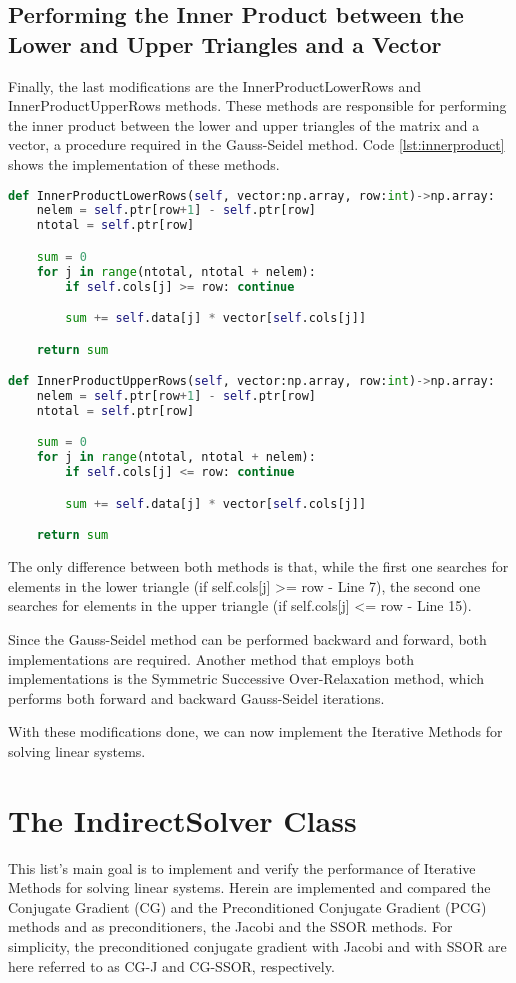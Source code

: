 \subsection{Performing the Inner Product between the Lower and Upper Triangles and a Vector} \label{sec:lower}
Finally, the last modifications are the InnerProductLowerRows and InnerProductUpperRows methods. These methods are responsible for performing the inner product between the lower and upper triangles of the matrix and a vector, a procedure required in the Gauss-Seidel method. Code \ref{lst:innerproduct} shows the implementation of these methods.
\begin{lstlisting}[language=python, caption={InnerProductLowerRows and InnerProductUpperRows methods implementation}, label={lst:innerproduct}]
def InnerProductLowerRows(self, vector:np.array, row:int)->np.array:
    nelem = self.ptr[row+1] - self.ptr[row]
    ntotal = self.ptr[row]

    sum = 0
    for j in range(ntotal, ntotal + nelem):
        if self.cols[j] >= row: continue

        sum += self.data[j] * vector[self.cols[j]]

    return sum

def InnerProductUpperRows(self, vector:np.array, row:int)->np.array:
    nelem = self.ptr[row+1] - self.ptr[row]
    ntotal = self.ptr[row]

    sum = 0
    for j in range(ntotal, ntotal + nelem):
        if self.cols[j] <= row: continue

        sum += self.data[j] * vector[self.cols[j]]

    return sum
\end{lstlisting}

The only difference between both methods is that, while the first one searches for elements in the lower triangle (if self.cols[j] >= row - Line 7), the second one searches for elements in the upper triangle (if self.cols[j] <= row - Line 15). 

Since the Gauss-Seidel method can be performed backward and forward, both implementations are required. Another method that employs both implementations is the Symmetric Successive Over-Relaxation method, which performs both forward and backward Gauss-Seidel iterations.

With these modifications done, we can now implement the Iterative Methods for solving linear systems.

\section{The IndirectSolver Class}\label{sec:indirectsolver}
This list's main goal is to implement and verify the performance of Iterative Methods for solving linear systems. Herein are implemented and compared the Conjugate Gradient (CG) and the Preconditioned Conjugate Gradient (PCG) methods and as preconditioners, the Jacobi and the SSOR methods. For simplicity, the preconditioned conjugate gradient with Jacobi and with SSOR are here referred to as CG-J and CG-SSOR, respectively.

